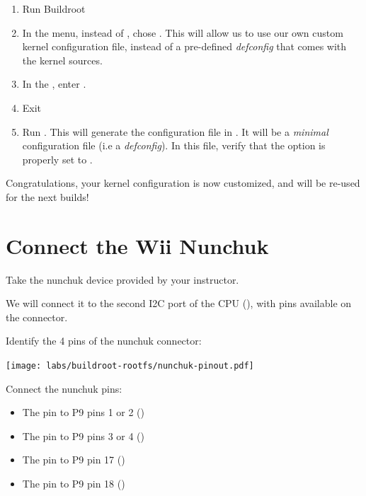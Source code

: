 \begin{enumerate}

\item Run Buildroot 

\item In the  menu, instead of ,
  chose . This will allow us to use
  our own custom kernel configuration file, instead of a pre-defined
  {\em defconfig} that comes with the kernel sources.

\item In the , enter
  .

\item Exit 

\item Run . This will generate the
  configuration file in
  . It will be a {\em
    minimal} configuration file (i.e a {\em defconfig}). In this file,
  verify that the option  is properly
  set to .

\end{enumerate}

Congratulations, your kernel configuration is now customized, and will
be re-used for the next builds!

\section{Connect the Wii Nunchuk}

Take the nunchuk device provided by your instructor.

We will connect it to the second I2C port of the CPU (),
with pins available on the  connector.

Identify the 4 pins of the nunchuk connector:

\begin{center}
\texttt{[image: labs/buildroot-rootfs/nunchuk-pinout.pdf]}
\end{center}

Connect the nunchuk pins:
\begin{itemize}
\item The  pin to P9 pins 1 or 2 ()
\item The  pin to P9 pins 3 or 4 ()
\item The  pin to P9 pin 17 ()
\item The  pin to P9 pin 18 ()
\end{itemize}


